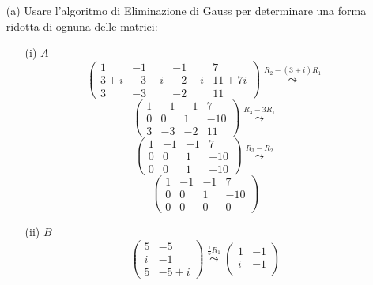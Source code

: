 \documentclass[a4paper]{article}
\theoremstyle{break}
\theoremstyle{break}
\theoremstyle{break}
\theoremstyle{break}
\begin{document}
\begin{enumerate}
	\item[(a)] Usare l’algoritmo di Eliminazione di Gauss per determinare una forma ridotta
	      di ognuna delle matrici:
	      \begin{enumerate}
		      \item[(i)] \( A \)
		            \[
			            \begin{pmatrix}
				            1     & -1    & -1   & 7       \\
				            3 + i & -3 -i & -2-i & 11 + 7i \\
				            3     & -3    & -2   & 11
			            \end{pmatrix}
			            \stackrel{R_2 - (3+i)R_1}{\leadsto}
		            \]
		            \[
			            \begin{pmatrix}
				            1 & -1 & -1 & 7   \\
				            0 & 0  & 1  & -10 \\
				            3 & -3 & -2 & 11
			            \end{pmatrix}
			            \stackrel{R_3 - 3R_1}{\leadsto}
		            \]
		            \[
			            \begin{pmatrix}
				            1 & -1 & -1 & 7   \\
				            0 & 0  & 1  & -10 \\
				            0 & 0  & 1  & -10
			            \end{pmatrix}
			            \stackrel{R_3 - R_2}{\leadsto}
		            \]
		            \[
			            \begin{pmatrix}
				            1 & -1 & -1 & 7   \\
				            0 & 0  & 1  & -10 \\
				            0 & 0  & 0  & 0
			            \end{pmatrix}
		            \]
		      \item[(ii)] \( B \)
		            \[
			            \begin{pmatrix}
				            5 & -5   \\
				            i & -1   \\
				            5 & -5+i
			            \end{pmatrix}
			            \stackrel{\frac{1}{5}R_1}{\leadsto}
			            \begin{pmatrix}
				            1 & -1    \\
				            i & -1    \\

\end{pmatrix}\]
\end{enumerate}
\end{enumerate}
\end{document}
